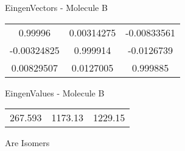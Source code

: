\begin{multicols}{2}
\begin{center}
\vtab
 EingenVectors - Molecule B     \\
\vtab
\begin{tabular}{|c c c|}
0.99996	 & 	0.00314275	 & 	-0.00833561	 \\
-0.00324825	 & 	0.999914	 & 	-0.0126739	 \\
0.00829507	 & 	0.0127005	 & 	0.999885
\end{tabular}

\vtab
 EingenValues - Molecule B     \\
\vtab
\begin{tabular}{|c c c|}
267.593	 & 	1173.13	 & 	1229.15
\end{tabular}

\end{center}
\end{multicols}
\begin{center}
\vtab
\vtab
\textcolor{NavyBlue}{\Large Are Isomers}
\end{center}
\newpage


